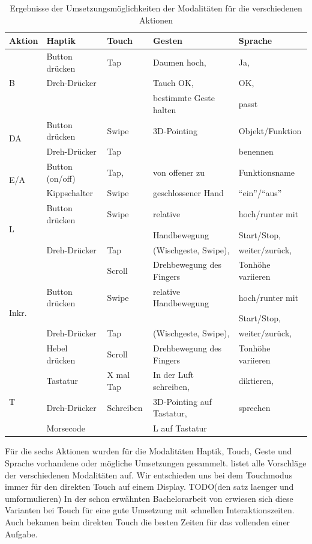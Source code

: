 \begin{table}[ht]
	\centering
	\begin{tabular}{|l|l|l|l|l|}
		\hline
		Aktion & Haptik & Touch & Gesten 			& Sprache\\
		\hline
				\multirow {3}{*}{B}
					& Button drücken		& Tap 				& Daumen hoch, 									& Ja,\\
					& Dreh-Drücker			& 						& Tauch OK, 										& OK,\\
					& 									& 						& bestimmte Geste halten 				& passt\\
		\hline
				\multirow{2}{*}{DA}
					& Button drücken		& Swipe  			& 3D-Pointing 								& Objekt/Funktion \\
					& Dreh-Drücker			& Tap					& 														& benennen \\		
		\hline
				\multirow{2}{*}{E/A}
					& Button (on/off)		& Tap,  			& von offener zu 								& Funktionsname\\
					& Kippschalter			& Swipe				& geschlossener Hand						& "`ein"'/"`aus"'\\
		\hline
				\multirow{3}{*}{L}
					& Button drücken		& Swipe				& relative  										& hoch/runter mit\\
					& 									& 						& Handbewegung									& Start/Stop,\\
					& Dreh-Drücker			& Tap 				& (Wischgeste, Swipe), 					& weiter/zurück,\\
					& 									& Scroll			& Drehbewegung des Fingers 			& Tonhöhe variieren\\		
		\hline
				\multirow{3}{*}{Inkr.}		
					& Button drücken		& Swipe				& relative Handbewegung 				& hoch/runter mit\\
					& 									& 						& 															& Start/Stop,\\
					& Dreh-Drücker			& Tap 				& (Wischgeste, Swipe), 					& weiter/zurück,\\
					& Hebel drücken			& Scroll			& Drehbewegung des Fingers			& Tonhöhe variieren\\					
		\hline
				\multirow{3}{*}{T}
					& Tastatur					& X mal Tap 	& In der Luft schreiben, 				& diktieren,\\
					& Dreh-Drücker			& Schreiben		& 3D-Pointing auf Tastatur,			& sprechen\\		
					& Morsecode					& 						& L auf Tastatur								&  \\	
		\hline			
  \end{tabular}
	\caption{Ergebnisse der Umsetzungsmöglichkeiten der Modalitäten für die verschiedenen Aktionen}
	\label{tab:table1}
\end{table}
Für die sechs Aktionen wurden für die Modalitäten Haptik, Touch, Geste und Sprache vorhandene oder mögliche Umsetzungen gesammelt. 
 listet alle Vorschläge der verschiedenen Modalitäten auf.
Wir entschieden uns bei dem Touchmodus immer für den direkten Touch auf einem Display. TODO(den satz laenger und umformulieren) 
In der schon erwähnten Bachelorarbeit von \citet{stracke2014touch} erwiesen sich diese Varianten bei Touch für eine gute Umsetzung mit schnellen Interaktionszeiten. 
Auch \citet{Rumelin:2013} bekamen beim direkten Touch die besten Zeiten für das vollenden einer Aufgabe.

